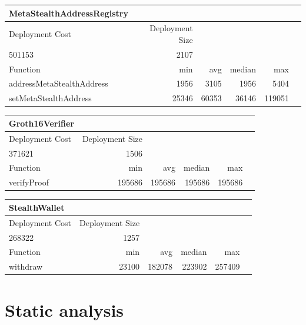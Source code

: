 \begin{table}[H]
    \centering
    \begin{tabular}{|l|r|r|r|r|r|}
        \hline
        \textbf{MetaStealthAddressRegistry} &  &  &  &\\
        \hline
        Deployment Cost & Deployment Size &  &  &\\
        501153 & 2107 &  &  &\\
        \hline
        Function & min & avg & median & max\\
        \hline
        addressMetaStealthAddress & 1956 & 3105 & 1956 & 5404\\
        setMetaStealthAddress & 25346 & 60353 & 36146 & 119051\\
        \hline
    \end{tabular}
\end{table}

\begin{table}[H]
    \centering
    \begin{tabular}{|l|r|r|r|r|r|}
        \hline
        \textbf{Groth16Verifier} &  &  &  &\\
        \hline
        Deployment Cost & Deployment Size &  &  &\\
        371621 & 1506 &  &  &\\
        \hline
        Function & min & avg & median & max\\
        \hline
        verifyProof & 195686 & 195686 & 195686 & 195686\\
        \hline
    \end{tabular}
\end{table}

\begin{table}[H]
    \centering
    \begin{tabular}{|l|r|r|r|r|r|}
        \hline
        \textbf{StealthWallet} &  &  &  &\\
        \hline
        Deployment Cost & Deployment Size &  &  &\\
        268322 & 1257 &  &  &\\
        \hline
        Function & min & avg & median & max\\
        \hline
        withdraw & 23100 & 182078 & 223902 & 257409\\
        \hline
    \end{tabular}
\end{table}

\section{Static analysis}

